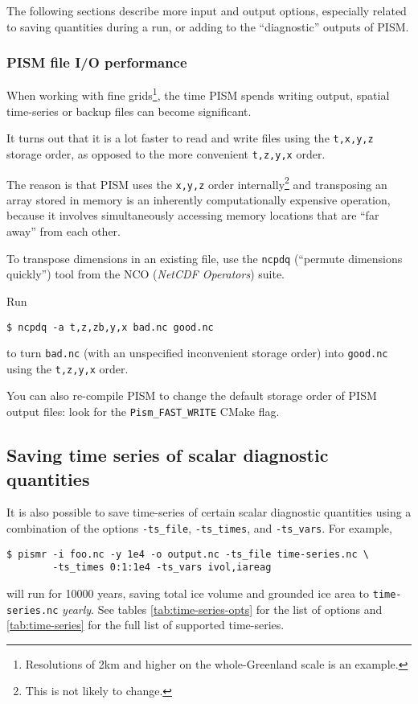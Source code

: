 The following sections describe more input and output options, especially related to saving quantities during a run, or adding to the ``diagnostic'' outputs of PISM.

\subsubsection{PISM file I/O performance}
\label{sec:pism-io-performance}

When working with fine grids\footnote{Resolutions of 2km and higher on the
  whole-Greenland scale is an example.}, the time PISM spends writing output,
spatial time-series or backup files can become significant.

It turns out that it is a lot faster to read and write files using the
\texttt{t,x,y,z} storage order, as opposed to the more convenient
\texttt{t,z,y,x} order.

The reason is that PISM uses the \texttt{x,y,z} order internally\footnote{This
  is not likely to change.} and transposing an array stored in memory is an
inherently computationally expensive operation, because it involves
simultaneously accessing memory locations that are ``far away'' from each
other.

To transpose dimensions in an existing file, use the \texttt{ncpdq} (``permute
dimensions quickly'') tool from the NCO (\emph{NetCDF Operators}) suite.

Run
\begin{verbatim}
$ ncpdq -a t,z,zb,y,x bad.nc good.nc
\end{verbatim}%
to turn \texttt{bad.nc} (with an unspecified inconvenient storage order) into
\texttt{good.nc} using the \texttt{t,z,y,x} order.

You can also re-compile PISM to change the default storage order of PISM output
files: look for the \texttt{Pism_FAST_WRITE} CMake flag.

\subsection{Saving time series of scalar diagnostic quantities}
\label{sec:saving-time-series}
 It is also possible to save time-series of certain scalar diagnostic quantities using a combination of the options \texttt{-ts_file}, \texttt{-ts_times}, and \texttt{-ts_vars}.  For example,
\begin{verbatim}
$ pismr -i foo.nc -y 1e4 -o output.nc -ts_file time-series.nc \
        -ts_times 0:1:1e4 -ts_vars ivol,iareag
\end{verbatim} %
will run for 10000 years, saving total ice volume and grounded ice area to \texttt{time-series.nc} \emph{yearly}. See tables \ref{tab:time-series-opts} for the list of options and \ref{tab:time-series} for the full list of supported time-series.

